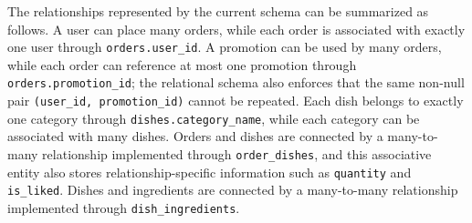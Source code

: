 The relationships represented by the current schema can be summarized as follows. A user can place many orders, while each order is associated with exactly one user through \texttt{orders.user\_id}. A promotion can be used by many orders, while each order can reference at most one promotion through \texttt{orders.promotion\_id}; the relational schema also enforces that the same non-null pair \texttt{(user\_id, promotion\_id)} cannot be repeated. Each dish belongs to exactly one category through \texttt{dishes.category\_name}, while each category can be associated with many dishes. Orders and dishes are connected by a many-to-many relationship implemented through \texttt{order\_dishes}, and this associative entity also stores relationship-specific information such as \texttt{quantity} and \texttt{is\_liked}. Dishes and ingredients are connected by a many-to-many relationship implemented through \texttt{dish\_ingredients}.
